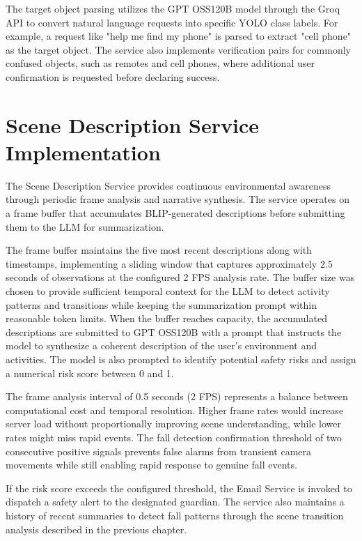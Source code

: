 \documentclass[12pt,a4paper]{report}
\begin{document}
The target object parsing utilizes the GPT OSS120B model through the Groq API to convert natural language requests into specific YOLO class labels. For example, a request like "help me find my phone" is parsed to extract "cell phone" as the target object. The service also implements verification pairs for commonly confused objects, such as remotes and cell phones, where additional user confirmation is requested before declaring success.

\section{Scene Description Service Implementation}

The Scene Description Service provides continuous environmental awareness through periodic frame analysis and narrative synthesis. The service operates on a frame buffer that accumulates BLIP-generated descriptions before submitting them to the LLM for summarization.

The frame buffer maintains the five most recent descriptions along with timestamps, implementing a sliding window that captures approximately 2.5 seconds of observations at the configured 2 FPS analysis rate. The buffer size was chosen to provide sufficient temporal context for the LLM to detect activity patterns and transitions while keeping the summarization prompt within reasonable token limits. When the buffer reaches capacity, the accumulated descriptions are submitted to GPT OSS120B with a prompt that instructs the model to synthesize a coherent description of the user's environment and activities. The model is also prompted to identify potential safety risks and assign a numerical risk score between 0 and 1.

The frame analysis interval of 0.5 seconds (2 FPS) represents a balance between computational cost and temporal resolution. Higher frame rates would increase server load without proportionally improving scene understanding, while lower rates might miss rapid events. The fall detection confirmation threshold of two consecutive positive signals prevents false alarms from transient camera movements while still enabling rapid response to genuine fall events.

If the risk score exceeds the configured threshold, the Email Service is invoked to dispatch a safety alert to the designated guardian. The service also maintains a history of recent summaries to detect fall patterns through the scene transition analysis described in the previous chapter.
\end{document}
